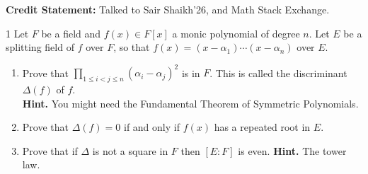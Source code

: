 \documentclass[12pt]{article}
\begin{document}

\textbf{Credit Statement:} Talked to Sair Shaikh'26, and Math Stack Exchange.


\begin{problem}{1}
    Let $F$ be a field and $f(x) \in F[x]$ a monic polynomial of degree $n$.  Let $E$ be a splitting field of $f$ over $F$, so that $f(x) = (x-\alpha_1)\cdots (x-\alpha_n)$ over $E$.
    \begin{enumerate}\renewcommand{\itemsep}{2mm}
    \item Prove that $\prod_{1 \leq i < j \leq n} (\alpha_i-\alpha_j)^2$
    is in $F$.  This is called the discriminant $\Delta(f)$ of
    $f$. \\ \textbf{Hint.} You might need the Fundamental Theorem of Symmetric Polynomials. 

    \item Prove that $\Delta(f)=0$ if and only if $f(x)$ has a repeated
    root in $E$.

    \item Prove that if $\Delta$ is not a square in $F$ then $[E:F]$ is
    even.  \textbf{Hint.} The tower law.
    \end{enumerate} 
\end{problem}
\end{document}
